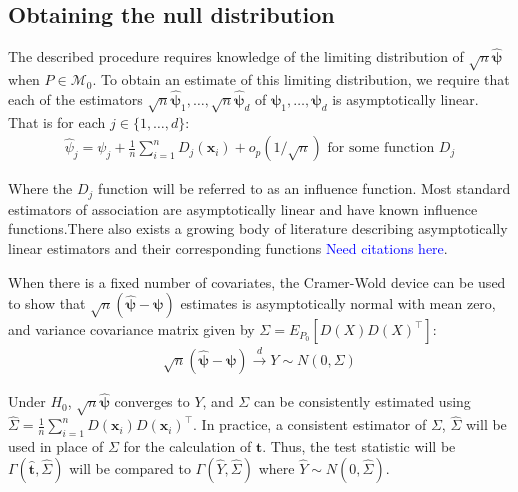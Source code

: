 \documentclass{article}
\newcommand{\vmat}{\Sigma}
\newcommand{\rvo}{X}
\newcommand{\disto}{P}
\newcommand{\tst}{\hat{\boldsymbol{t}}}
\newcommand{\rvt}{Y}
\newcommand{\rnp}{\sqrt{n} \hat{\boldsymbol{\psi}}}
\begin{document}

\subsection{Obtaining the null distribution}
\label{ssec:obtaining_null}
The described procedure requires knowledge of the limiting distribution of $\rnp$ when $P \in \mathscr{M}_0$.  To obtain an estimate of this limiting distribution, we require that each of the estimators $\rnp_1, \dots, \rnp_d$ of $\boldsymbol{\psi}_1, \dots, \boldsymbol{\psi}_d$ is asymptotically linear.  That is for each $j \in \{1, \dots, d\}$:
\begin{align*}
\hat{\psi}_j = \psi_j + \frac{1}{n}\sum_{i=1}^n D_j(\boldsymbol{x}_i) + o_p(1/\sqrt{n}) \text{ for some function } D_j
\end{align*}

Where the $D_j$ function will be referred to as an influence function. Most standard estimators of association are asymptotically linear and have known influence functions.There also exists a growing body of literature describing asymptotically linear estimators and their corresponding functions \textcolor{blue}{Need citations here}.


When there is a fixed number of covariates, the Cramer-Wold device can be used to show that $\sqrt{n}( \hat{\boldsymbol{\psi}}  - \boldsymbol{\psi})$ estimates is asymptotically normal with mean zero, and variance covariance matrix given by $\Sigma = E_{\disto_0}\left[D(\rvo) D(\rvo)^\top \right]$:
\begin{align*}
    \sqrt{n}\left(\hat{\boldsymbol{\psi}} - \boldsymbol{\psi}\right) \xrightarrow{d} \rvt \sim N\left(0, \Sigma\right)
\end{align*}

Under $H_0$, $\rnp$ converges to $\rvt$, and $\Sigma$ can be consistently estimated using $\widehat{\Sigma} = \frac{1}{n}\sum_{i = 1}^n D(\boldsymbol{x}_i) D(\boldsymbol{x}_i)^\top$.  In practice, a consistent estimator of $\vmat$, $\hat{\vmat}$ will be used in place of $\vmat$ for the calculation of $\tst$. Thus, the test statistic will be $\Gamma(\tst, \hat{\Sigma})$ will be compared to $\Gamma(\hat{\rvt}, \hat{\Sigma})$ where $\hat{\rvt} \sim N\left(0, \hat{\Sigma}\right)$.
\end{document}
